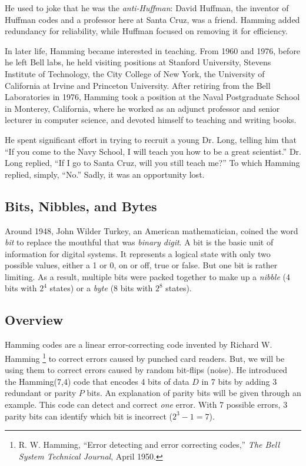 \documentclass[11pt]{article}
\begin{document}
He used to joke that he was the \emph{anti-Huffman}: David Huffman, the inventor of Huffman codes
and a professor here at Santa Cruz, was a friend. Hamming added redundancy for reliability, while Huffman focused
on removing it for efficiency.

In later life, Hamming became interested in teaching. From 1960 and
1976, before
he left Bell labs, he held visiting positions at Stanford
University, Stevens Institute of Technology, the City College of
New York, the University of California at Irvine and Princeton
University.
After retiring from the Bell Laboratories in 1976, Hamming took a position
at the Naval Postgraduate School in Monterey, California, where he
worked as an adjunct professor and senior lecturer in computer
science, and devoted himself to teaching and writing books.

He spent significant effort in trying
to recruit a young Dr.\xspace Long, telling him that ``If you come to the Navy School, I will
teach
you how to be a great scientist.'' 
Dr.\xspace Long replied, ``If I go to Santa Cruz, will you still teach me?'' To which Hamming
replied, simply, ``No.'' Sadly, it was an opportunity lost.

\subsection{Bits, Nibbles, and Bytes}
Around 1948, John Wilder Turkey, an American mathematician, coined the word \emph{bit} to
replace the mouthful that was \emph{binary digit}. A bit is the basic unit of information
for digital systems. It represents a logical state with only two possible values, 
either a 1 or 0, on or off, true or false. But one bit is rather limiting. As a result,
multiple bits were packed together to make up a \emph{nibble} (4 bits with $2^4$ states)
or a \emph{byte} (8 bits with $2^8$ states).

\subsection{Overview}
Hamming codes are a linear error-correcting code invented by Richard W. Hamming \footnote{R. W. Hamming, 
``Error detecting and error correcting codes,'' \textit{The Bell System Technical Journal}, April 1950.} to correct
errors caused by punched card readers. 
But, we will be using them to correct errors caused by random
bit-flips (noise). He introduced the Hamming(7,4) code that encodes 4 bits
of data $D$ in 7 bits by adding 3 redundant or parity $P$ bits. An explanation of parity bits will
be given through an example. This code can detect and
correct \emph{one} error. With 7 possible errors, 3 parity bits can identify which bit is incorrect ($2^3 -1 = 7$).
\end{document}
